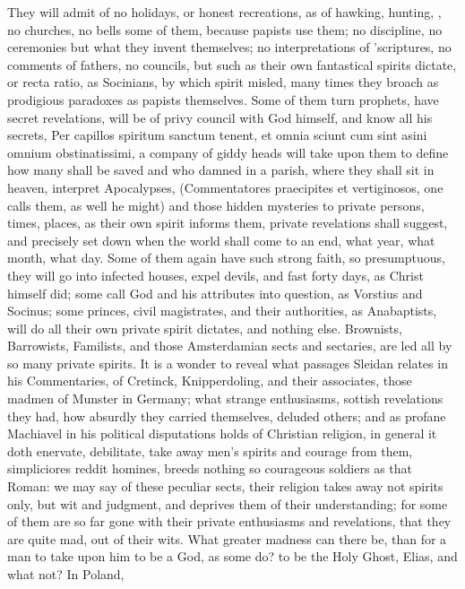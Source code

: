 {They will admit of no holidays, or honest recreations, as of hawking,
hunting, \etc{}, no churches, no bells some of them, because papists use
them; no discipline, no ceremonies but what they invent themselves; no
interpretations of 'scriptures, no comments of fathers, no councils,
but such as their own fantastical spirits dictate, or recta ratio, as
Socinians, by which spirit misled, many times they broach as prodigious
paradoxes as papists themselves. Some of them turn prophets, have
secret revelations, will be of privy council with God himself, and know
all his secrets,  Per capillos spiritum sanctum tenent, et omnia
sciunt cum sint asini omnium obstinatissimi, a company of giddy heads
will take upon them to define how many shall be saved and who damned in
a parish, where they shall sit in heaven, interpret Apocalypses,
(Commentatores praecipites et vertiginosos, one calls them, as well he
might) and those hidden mysteries to private persons, times, places, as
their own spirit informs them, private revelations shall suggest, and
precisely set down when the world shall come to an end, what year, what
month, what day. Some of them again have such strong faith, so
presumptuous, they will go into infected houses, expel devils, and fast
forty days, as Christ himself did; some call God and his attributes
into question, as Vorstius and Socinus; some princes, civil
magistrates, and their authorities, as Anabaptists, will do all their
own private spirit dictates, and nothing else. Brownists, Barrowists,
Familists, and those Amsterdamian sects and sectaries, are led all by
so many private spirits. It is a wonder to reveal what passages Sleidan
relates in his Commentaries, of Cretinck, Knipperdoling, and their
associates, those madmen of Munster in Germany; what strange
enthusiasms, sottish revelations they had, how absurdly they carried
themselves, deluded others; and as profane Machiavel in his political
disputations holds of Christian religion, in general it doth enervate,
debilitate, take away men's spirits and courage from them, simpliciores
reddit homines, breeds nothing so courageous soldiers as that Roman: we
may say of these peculiar sects, their religion takes away not spirits
only, but wit and judgment, and deprives them of their understanding;
for some of them are so far gone with their private enthusiasms and
revelations, that they are quite mad, out of their wits. What greater
madness can there be, than for a man to take upon him to be a God, as
some do? to be the Holy Ghost, Elias, and what not? In Poland,
}
